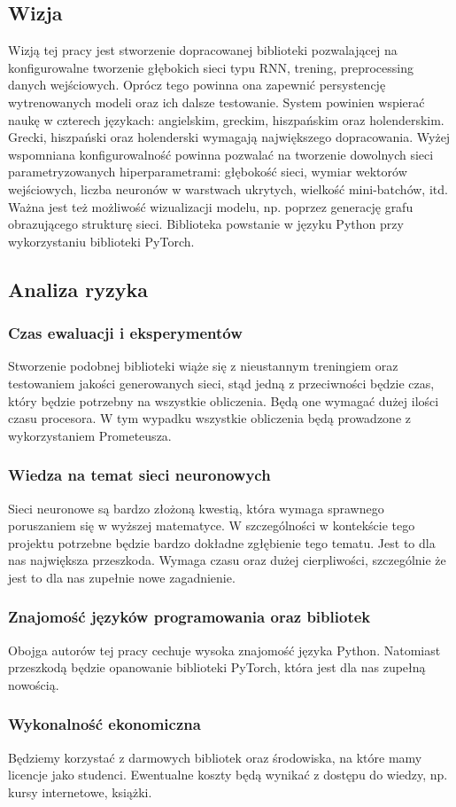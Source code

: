 \subsection{Wizja}
Wizją tej pracy jest stworzenie dopracowanej biblioteki pozwalającej na konfigurowalne tworzenie 
głębokich sieci typu RNN, trening, preprocessing danych wejściowych. Oprócz tego powinna ona 
zapewnić persystencję wytrenowanych modeli oraz ich dalsze testowanie. System powinien wspierać 
naukę w czterech językach: angielskim, greckim, hiszpańskim oraz holenderskim. Grecki, hiszpański 
oraz holenderski wymagają największego dopracowania. Wyżej wspomniana konfigurowalność powinna 
pozwalać na tworzenie dowolnych sieci parametryzowanych hiperparametrami: głębokość sieci, wymiar 
wektorów wejściowych, liczba neuronów w warstwach ukrytych, wielkość mini-batchów, itd. Ważna jest 
też możliwość wizualizacji modelu, np. poprzez generację grafu obrazującego strukturę sieci. 
Biblioteka powstanie w języku Python przy wykorzystaniu biblioteki PyTorch.

\subsection{Analiza ryzyka}

\subsubsection{Czas ewaluacji i eksperymentów}
Stworzenie podobnej biblioteki wiąże się z nieustannym treningiem oraz testowaniem jakości 
generowanych sieci, stąd jedną z przeciwności będzie czas, który będzie potrzebny na wszystkie 
obliczenia. Będą one wymagać dużej ilości czasu procesora. W tym wypadku wszystkie obliczenia 
będą prowadzone z wykorzystaniem Prometeusza.

\subsubsection{Wiedza na temat sieci neuronowych}
Sieci neuronowe są bardzo złożoną kwestią, która wymaga sprawnego poruszaniem się w wyższej 
matematyce. W szczególności w kontekście tego projektu potrzebne będzie bardzo dokładne zgłębienie 
tego tematu. Jest to dla nas największa przeszkoda. Wymaga czasu oraz dużej cierpliwości, 
szczególnie że jest to dla nas zupełnie nowe zagadnienie.

\subsubsection{Znajomość języków programowania oraz bibliotek }
Obojga autorów tej pracy cechuje wysoka znajomość języka Python. Natomiast przeszkodą będzie 
opanowanie biblioteki PyTorch, która jest dla nas zupełną nowością.

\subsubsection{Wykonalność ekonomiczna }
Będziemy korzystać z darmowych bibliotek oraz środowiska, na które mamy licencje jako studenci. 
Ewentualne koszty będą wynikać z dostępu do wiedzy, np. kursy internetowe, książki.